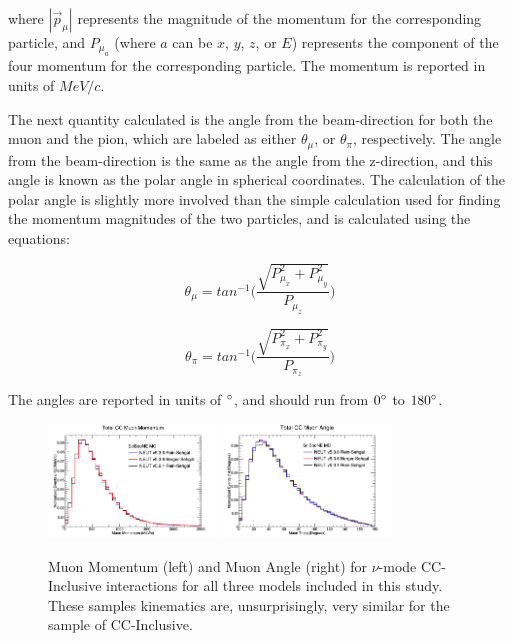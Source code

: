 \documentclass[11pt]{article}
\begin{document}
\noindent
where $|\vec{p}_\mu|$ represents the magnitude of the momentum for the corresponding particle, and $P_{\mu_a}$ (where $a$ can be $x$, $y$, $z$, or $E$) represents the component of the four momentum for the corresponding particle. The momentum is reported in units of $MeV/c$.

The next quantity calculated is the angle from the beam-direction for both the muon and the pion, which are labeled as either $\theta_\mu$, or $\theta_\pi$, respectively. The angle from the beam-direction is the same as the angle from the z-direction, and this angle is known as the polar angle in spherical coordinates. The calculation of the polar angle is slightly more involved than the simple calculation used for finding the momentum magnitudes of the two particles, and is calculated using the equations:

\begin{equation}
\theta_\mu = tan^{-1}\Bigg(\frac{\sqrt{P_{\mu_x}^2 + P_{\mu_y}^2}}{P_{\mu_z}}\Bigg)
\end{equation}

\begin{equation}
\theta_\pi = tan^{-1}\Bigg(\frac{\sqrt{P_{\pi_x}^2 + P_{\pi_y}^2}}{P_{\pi_z}}\Bigg)
\end{equation}

\noindent
The angles are reported in units of $\degree$, and should run from $0\degree$ to $180\degree$.

\begin{figure}[H]
\centering
\includegraphics[width=0.4\textwidth]{CCInclusivePlots/NMCCInclusiveTotalMomentum.png}
\includegraphics[width=0.4\textwidth]{CCInclusivePlots/NMCCInclusiveTotalAngle.png}
\caption{Muon Momentum (left) and Muon Angle (right) for $\nu$-mode CC-Inclusive interactions for all three models included in this study. These samples kinematics are, unsurprisingly, very similar for the sample of CC-Inclusive.}
\label{fig:NuModeCCInclusiveMomAndAng}
\end{figure}
\end{document}
